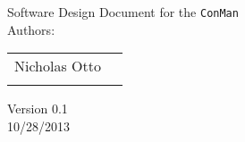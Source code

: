 \begin{titlepage}
\Huge
\vspace{2cm}
\begin{center}
Software Design Document for the \texttt{ConMan}\\
\vspace{3cm}
\Large
Authors:\\ 

\begin{tabular}{l l}\hline
Nicholas Otto & \\
 & 
\end{tabular}
\vspace{1cm}

Version 0.1\\
10/28/2013
\end{center}


\end{titlepage}
